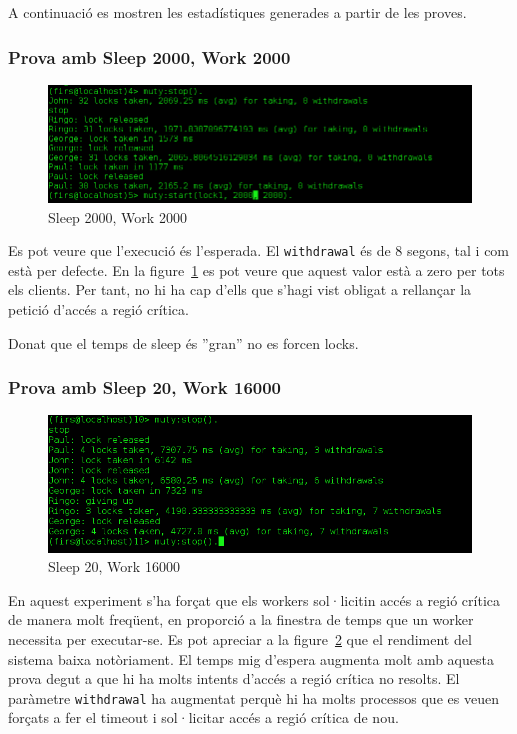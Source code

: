 \documentclass[a4paper, 11pt]{article}
\begin{document}
A continuació es mostren les estadístiques generades a partir de les proves.

\subsubsection{Prova amb Sleep 2000, Work 2000}

\begin{figure}[H]
	\centering
    \includegraphics[width=1.0\textwidth]{figures/2000-2000lock1}
    \caption{Sleep 2000, Work 2000 \label{fig:2000-2000lock1}}    
\end{figure}


Es pot veure que l'execució és l'esperada. El \texttt{withdrawal} és de 8
segons, tal i com està per defecte. En la figure~\ref{fig:2000-2000lock1} es pot
veure que aquest valor està a zero per tots els clients. Per tant, no hi ha cap
d'ells que s'hagi vist obligat a rellançar la petició d'accés a regió crítica.

Donat que el temps de sleep és ''gran'' no es forcen locks. 

\subsubsection{Prova amb Sleep 20, Work 16000}

\begin{figure}[H]
	\centering
    \includegraphics[width=1.0\textwidth]{figures/20-16000lock1}
    \caption{Sleep 20, Work 16000 \label{fig:20-16000lock1}}    
\end{figure}

En aquest experiment s'ha forçat que els workers sol·licitin accés a regió
crítica de manera molt freqüent, en proporció a la finestra de temps que un
worker necessita per executar-se.  
Es pot apreciar a la figure~\ref{fig:20-16000lock1} que el rendiment del sistema
baixa notòriament. El temps mig d'espera augmenta molt amb aquesta prova degut a
que hi ha molts intents d'accés a regió crítica no resolts. El paràmetre
\texttt{withdrawal} ha augmentat perquè hi ha molts processos que es veuen
forçats a fer el timeout i sol·licitar accés a regió crítica de nou.
\end{document}

